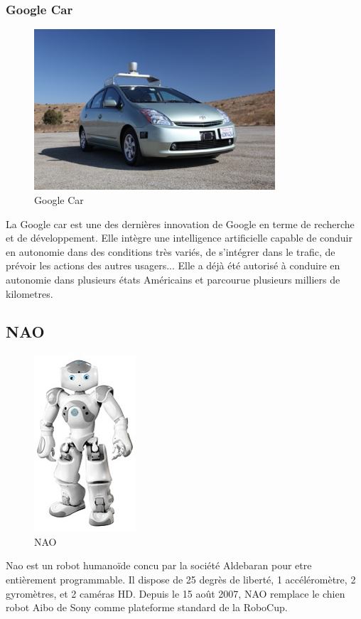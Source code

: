 \documentclass[11pt]{report} %
\begin{document}
			\subsubsection{Google Car}
				\begin{figure}[htb]
				\centering
				\includegraphics[width=0.8\textwidth]{google-car.jpeg}
				\caption{Google Car}
				\label{fig:google-car}
				\end{figure}
				La Google car est une des dernières innovation de Google en terme de recherche et de développement.
				Elle intègre une intelligence artificielle capable de conduir en autonomie dans des conditions très variés, de s'intégrer dans le trafic, de prévoir les actions des autres usagers... Elle a déjà été autorisé à conduire en autonomie dans plusieurs états Américains et parcourue plusieurs milliers de kilometres.
		\newpage
		\subsection{NAO}
			\begin{figure}[htb]
			\centering
			\includegraphics[scale=1]{nao2.jpg}
			\caption{NAO}
			\label{fig:nao}
			\end{figure}
			Nao est un robot humanoïde concu par la société Aldebaran pour etre entièrement programmable. Il dispose de 25 degrès de liberté, 1 accéléromètre, 2 gyromètres, et 2 caméras HD. Depuis le 15 août 2007, NAO remplace le chien robot Aibo de Sony comme plateforme standard de la RoboCup.
		\newpage
\end{document}
